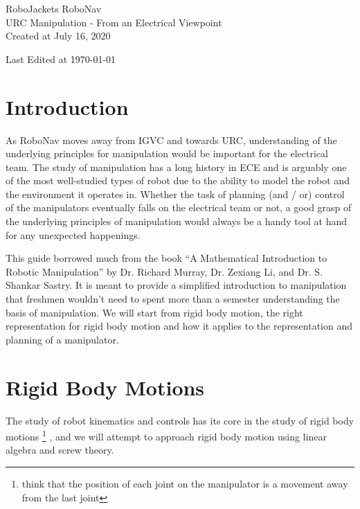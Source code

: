\documentclass[letterpaper]{article}
\begin{document}
\begin{titlepage}
\centering
	{\LARGE RoboJackets RoboNav}\\
	\vspace{1cm}
	{\Large URC Manipulation - From an Electrical Viewpoint}\\
	\vfill
	{\large Created at July 16, 2020}\\
	\vspace{1cm}
	{\large Last Edited at \today\par}
\end{titlepage}
\pagebreak

\tableofcontents

\pagebreak

\section{Introduction}
As RoboNav moves away from IGVC and towards URC, understanding of the underlying principles for manipulation 
would be important for the electrical team. The study of manipulation has a long history in ECE and is arguably
one of the most well-studied types of robot due to the ability to model the robot and the environment it operates
in. Whether the task of planning (and / or) control of the manipulators eventually falls on the electrical team
or not, a good grasp of the underlying principles of manipulation would always be a handy tool at hand for any
unexpected happenings. 

This guide borrowed much from the book ``A Mathematical Introduction to Robotic Manipulation'' by
Dr. Richard Murray, Dr. Zexiang Li, and Dr. S. Shankar Sastry. It is meant to provide a simplified introduction
to manipulation that freshmen wouldn't need to spent more than a semester understanding the basis
of manipulation. We will start from rigid body motion, the right representation for rigid body motion and how it
applies to the representation and planning of a manipulator.

\section{Rigid Body Motions}
The study of robot kinematics and controls has its core in the study of rigid body motions
\footnote{think that the position of each joint on the manipulator is a movement away from the last joint}
, and we will attempt to approach rigid body motion using linear algebra and screw theory.
\end{document}
